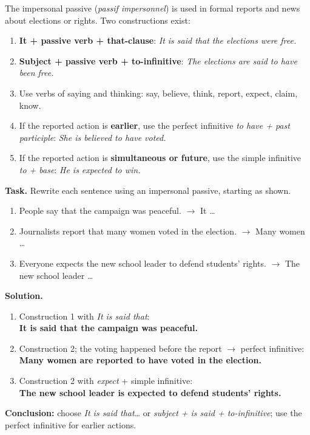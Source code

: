 \documentclass[11pt]{article}
\newcommand{\cle}[1]{{\popxbold\color{popdark}#1}}
\begin{document}
\begin{methode}
The impersonal passive (\emph{passif impersonnel}) is used in formal reports and news about elections or rights. Two constructions exist:
\begin{enumerate}
\item \textbf{It + passive verb + that-clause}: \emph{It is said that the elections were free.}
\item \textbf{Subject + passive verb + to-infinitive}: \emph{The elections are said to have been free.}
\item Use verbs of saying and thinking: \cle{say}, \cle{believe}, \cle{think}, \cle{report}, \cle{expect}, \cle{claim}, \cle{know}.
\item If the reported action is \textbf{earlier}, use the perfect infinitive \emph{to have + past participle}: \emph{She is believed to have voted.}
\item If the reported action is \textbf{simultaneous or future}, use the simple infinitive \emph{to + base}: \emph{He is expected to win.}
\end{enumerate}
\end{methode}

\begin{exoresolu}
\textbf{Task.} Rewrite each sentence using an impersonal passive, starting as shown.
\begin{enumerate}
\item People say that the campaign was peaceful. $\rightarrow$ It \ldots
\item Journalists report that many women voted in the election. $\rightarrow$ Many women \ldots
\item Everyone expects the new school leader to defend students' rights. $\rightarrow$ The new school leader \ldots
\end{enumerate}
\tcblower
\textbf{Solution.}
\begin{enumerate}
\item Construction 1 with \emph{It is said that}: \\
\textbf{It is said that the campaign was peaceful.}
\item Construction 2; the voting happened before the report $\rightarrow$ perfect infinitive: \\
\textbf{Many women are reported to have voted in the election.}
\item Construction 2 with \emph{expect} + simple infinitive: \\
\textbf{The new school leader is expected to defend students' rights.}
\end{enumerate}
\textbf{Conclusion:} choose \emph{It is said that\ldots} or \emph{subject + is said + to-infinitive}; use the perfect infinitive for earlier actions.
\end{exoresolu}
\end{document}
